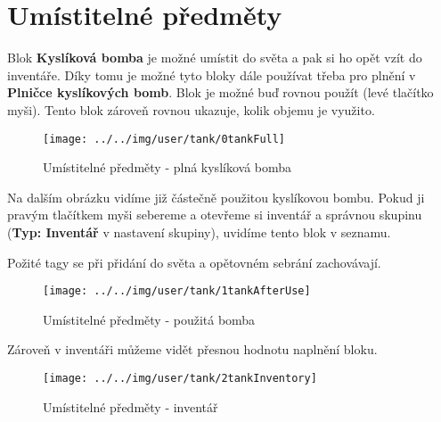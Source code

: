 
\section{Umístitelné předměty}

Blok \textbf{Kyslíková bomba} je možné umístit do světa a pak si ho opět vzít do inventáře. Díky tomu je možné tyto bloky dále používat třeba pro plnění v \textbf{Plničce kyslíkových bomb}.
Blok je možné buď rovnou použít (levé tlačítko myši).
Tento blok zároveň rovnou ukazuje, kolik objemu je využito.

\begin{figure}[!ht]\centering
\texttt{[image: ../../img/user/tank/0tankFull]}

\caption{Umístitelné předměty - plná kyslíková bomba}
\label{fig:user_tank_0tankFull}

\end{figure}

\FloatBarrier

Na dalším obrázku vidíme již částečně použitou kyslíkovou bombu. Pokud ji pravým tlačítkem myši sebereme a otevřeme si inventář a správnou skupinu (\textbf{Typ: Inventář} v nastavení skupiny), uvidíme tento blok v seznamu.

Požité tagy se při přidání do světa a opětovném sebrání zachovávají.

\begin{figure}[!ht]\centering
\texttt{[image: ../../img/user/tank/1tankAfterUse]}

\caption{Umístitelné předměty - použitá bomba}
\label{fig:user_tank_1tankAfterUse}

\end{figure}

\FloatBarrier

Zároveň v inventáři můžeme vidět přesnou hodnotu naplnění bloku.

\begin{figure}[!ht]\centering
\texttt{[image: ../../img/user/tank/2tankInventory]}

\caption{Umístitelné předměty - inventář}
\label{fig:user_tank_2tankInventory}

\end{figure}



\FloatBarrier
